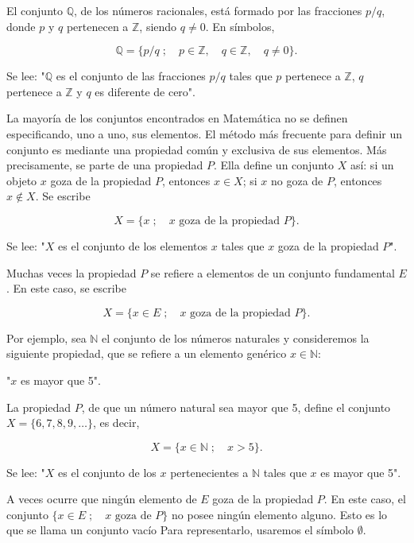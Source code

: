 El conjunto \( \mathbb{Q} \), de los números racionales, está formado por las fracciones \( p/q \), donde \( p \) y \( q \) pertenecen a \( \mathbb{Z} \), siendo \( q \neq 0 \). En símbolos,

\[
\mathbb{Q} = \{p/q \; ; \quad p \in \mathbb{Z}, \quad q \in \mathbb{Z}, \quad q \neq 0\}.
\]

Se lee: "\( \mathbb{Q} \) es el conjunto de las fracciones \( p/q \) tales que \( p \) pertenece a \( \mathbb{Z} \), \( q \) pertenece a \( \mathbb{Z} \) y \( q \) es diferente de cero".

La mayoría de los conjuntos encontrados en Matemática no se definen especificando, uno a uno, sus elementos. El método más frecuente para definir un conjunto es mediante una propiedad común y exclusiva de sus elementos. Más precisamente, se parte de una propiedad \( P \). Ella define un conjunto \( X \) así: si un objeto \( x \) goza de la propiedad \( P \), entonces \( x \in X \); si \( x \) no goza de \( P \), entonces \( x \notin X \). Se escribe

\[X = \{x \; ; \quad x \text{ goza de la propiedad } P\}.\]

Se lee: "\( X \) es el conjunto de los elementos \( x \) tales que \( x \) goza de la propiedad \( P \)".

Muchas veces la propiedad \( P \) se refiere a elementos de un conjunto fundamental \( E \). En este caso, se escribe

\[X = \{x \in E \; ; \quad x \text{ goza de la propiedad } P\}.\]

Por ejemplo, sea \( \mathbb{N} \) el conjunto de los números naturales y consideremos la siguiente propiedad, que se refiere a un elemento genérico \( x \in \mathbb{N} \):

"\( x \) es mayor que 5".

La propiedad \( P \), de que un número natural sea mayor que 5, define el conjunto \( X = \{6, 7, 8, 9, \dots\} \), es decir,

\[X = \{x \in \mathbb{N} \; ; \quad x > 5\}.\]

Se lee: "\( X \) es el conjunto de los \( x \) pertenecientes a \( \mathbb{N} \) tales que \( x \) es mayor que 5".

A veces ocurre que ningún elemento de \( E \) goza de la propiedad \( P \). En este caso, el conjunto \( \{x \in E \; ; \quad x \text{ goza de } P\} \) no posee ningún elemento alguno. Esto es lo que se llama un conjunto vacío Para representarlo, usaremos el símbolo \(\emptyset\).


